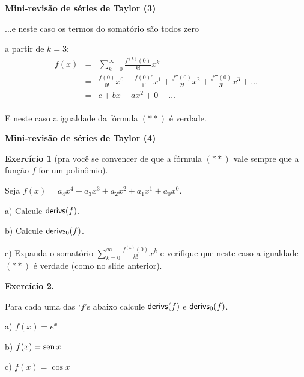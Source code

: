 \documentclass[oneside,12pt]{article}
\begin{document}

{\bf Mini-revisão de séries de Taylor (3)}

...e neste caso os termos do somatório são todos zero

a partir de $k=3$:
%
$$\begin{array}{rcl}
  f(x) &=& \displaystyle \sum_{k=0}^∞ \frac{f^{(k)}(0)}{k!} x^k \\[15pt]
       &=& \displaystyle
           \frac{f(0)}{0!} x^0 +
           \frac{f(0)'}{1!} x^1 +
           \frac{f''(0)}{2!} x^2 +
           \frac{f'''(0)}{3!} x^3 + \ldots \\[10pt]
       &=& c + bx + ax^2 + 0 + \ldots \\
  \end{array}
$$ 

E neste caso a igualdade da fórmula $(**)$ é verdade.

\newpage


{\bf Mini-revisão de séries de Taylor (4)}

\ssk


{\bf Exercício 1} (pra você se convencer de que a fórmula $(**)$ vale
sempre que a função $f$ for um polinômio).

Seja $f(x) = a_4x^4 + a_3x^3 + a_2x^2 + a_1x^1 + a_0x^0$.

\ssk

a) Calcule $\mathsf{derivs}(f)$.

b) Calcule $\mathsf{derivs}_0(f)$. 

c) Expanda o somatório $\sum_{k=0}^∞ \frac{f^{(k)}(0)}{k!} x^k$ e
verifique que neste caso a igualdade $(**)$ é verdade (como no slide
anterior).

\msk


{\bf Exercício 2.}

Para cada uma das `$f$'s abaixo calcule $\mathsf{derivs}(f)$ e $\mathsf{derivs}_0(f)$.

a) $f(x) = e^x$

b) $f(x) = \operatorname{sen} x$

c) $f(x) = \cos x$
\end{document}
